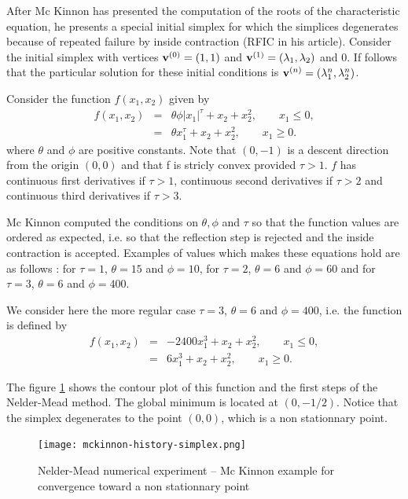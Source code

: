 After Mc Kinnon has presented the computation of the roots of the 
characteristic equation, he presents a special initial simplex 
for which the simplices degenerates because of repeated failure by inside 
contraction (RFIC in his article). Consider the initial simplex with
vertices $\mathbf{v}^{(0)} = (1,1)$ and $\mathbf{v}^{(1)} = (\lambda_1,\lambda_2)$ and 
$0$. If follows that the particular solution for these initial 
conditions is $\mathbf{v}^{(n)} = (\lambda_1^n,\lambda_2^n)$.

Consider the function $f(x_1,x_2)$ given by 
\begin{eqnarray}
\label{mckinnon-function}
f(x_1,x_2) &=& \theta \phi |x_1|^\tau + x_2 + x_2^2, \qquad x_1\leq 0,\\
&=&\theta x_1^\tau + x_2 + x_2^2, \qquad x_1\geq 0.
\end{eqnarray}
where $\theta$ and $\phi$ are positive constants. Note that $(0,-1)$
is a descent direction from the origin $(0,0)$ and that f is stricly convex 
provided $\tau>1$. $f$ has continuous first derivatives if $\tau>1$, continuous second 
derivatives if $\tau>2$ and continuous third derivatives if $\tau>3$.

Mc Kinnon computed the conditions on $\theta,\phi$ and $\tau$
so that the function values are ordered as expected, i.e. so that the 
reflection step is rejected and the inside contraction is accepted.
Examples of values which makes these equations hold are as follows :
for $\tau=1$, $\theta=15$ and $\phi = 10$, 
for $\tau=2$, $\theta=6$ and $\phi = 60$ and
for $\tau=3$, $\theta=6$ and $\phi = 400$.

We consider here the more regular case $\tau=3$, $\theta=6$
and $\phi = 400$, i.e. the function is defined by 
\begin{eqnarray}
\label{mckinnon-function3}
f(x_1,x_2) &=& - 2400 x_1^3 + x_2 + x_2^2, \qquad x_1\leq 0, \\
&=& 6 x_1^3 + x_2 + x_2^2, \qquad x_1\geq 0.
\end{eqnarray}

The figure \ref{fig-nm-numexp-mckinnon} shows the contour plot of this function and the first 
steps of the Nelder-Mead method.
The global minimum is located at $(0,-1/2)$.
Notice that the simplex degenerates to the
point $(0,0)$, which is a non stationnary point.

\begin{figure}
\begin{center}
\texttt{[image: mckinnon-history-simplex.png]}
\end{center}
\caption{Nelder-Mead numerical experiment -- Mc Kinnon example for convergence toward
a non stationnary point}
\label{fig-nm-numexp-mckinnon}
\end{figure}

